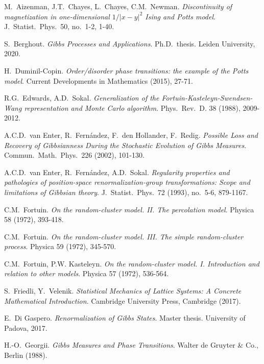 \documentclass[12pt]{article}
\newcommand{\1}{\mathbbm{1}}
\newcommand{\5}{\vspace{0.5cm}}
\theoremstyle{definition}
\begin{document}
\begin{thebibliography}{++}

 M.~Aizenman, J.T.~Chayes, L.~Chayes, C.M.~Newman. \textit{Discontinuity of magnetization in one-dimensional $1/|x-y|^2$ Ising and Potts model}. J.~Statist.~Phys.~50, no.~1-2, 1-40.

 S.~Berghout. \textit{Gibbs Processes and Applications}. Ph.D.~thesis. Leiden University, 2020.

 H.~Duminil-Copin. \textit{Order/disorder phase transitions: the example of the Potts model}. Current Developments in Mathematics (2015), 27-71.

 R.G.~Edwards, A.D.~Sokal. \textit{Generalization of the Fortuin-Kasteleyn-Swendsen-Wang representation and Monte Carlo algorithm}. Phys.~Rev.~D. 38 (1988), 2009-2012.

 A.C.D.~van Enter, R.~Fern\'andez, F.~den Hollander, F.~Redig. \textit{Possible Loss and Recovery of Gibbsianness During the Stochastic Evolution of Gibbs Measures}. Commun.~Math.~Phys.~226 (2002), 101-130.

 A.C.D.~van Enter, R.~Fern\'andez, A.D.~Sokal. \textit{Regularity properties and pathologies of position-space renormalization-group transformations: Scope and limitations of Gibbsian theory}. J.~Statist.~Phys.~72 (1993), no.~5-6, 879-1167.

 C.M.~Fortuin. \textit{On the random-cluster model. II. The percolation model}. Physica 58 (1972), 393-418.

 C.M.~Fortuin. \textit{On the random-cluster model. III. The simple random-cluster process}. Physica 59 (1972), 345-570.

 C.M.~Fortuin, P.W. Kasteleyn. \textit{On the random-cluster model. I. Introduction and relation to other models}. Physica 57 (1972), 536-564.

 S.~Friedli, Y.~Velenik. \textit{Statistical Mechanics of Lattice Systems: A Concrete Mathematical Introduction}. Cambridge University Press, Cambridge (2017).

 E.~Di Gaspero. \textit{Renormalization of Gibbs States}. Master thesis. University of Padova, 2017.

 H.-O.~Georgii. \textit{Gibbs Measures and Phase Transitions}. Walter de Gruyter \& Co., Berlin (1988).


\end{thebibliography}
\end{document}

